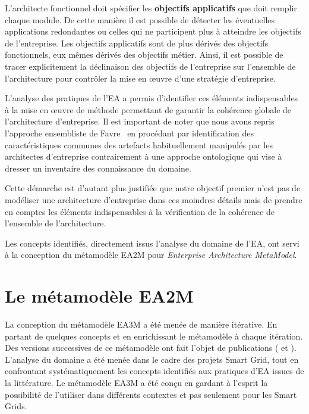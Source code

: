     L'architecte fonctionnel doit spécifier les \textbf{objectifs applicatifs} que doit remplir chaque module. De
    cette manière il est possible de détecter les éventuelles applications redondantes ou celles qui
    ne participent plus à atteindre les objectifs de l'entreprise. Les objectifs applicatifs sont de plus dérivés
    des objectifs fonctionnels, eux mêmes dérivés des objectifs métier. Ainsi, il est possible de tracer
    explicitement la déclinaison des objectifs de l'entreprise sur l'ensemble de l'architecture pour contrôler
    la mise en œuvre d'une stratégie d'entreprise.

    L'analyse des pratiques de l'EA a permis d'identifier ces éléments indispensables à la mise en œuvre
    de méthode permettant de garantir la cohérence globale de l'architecture d'entreprise. Il est important
    de noter que nous avons repris l'approche ensembliste de Favre~\cite{favre2005foundations} en procédant
    par identification des caractéristiques communes des artefacts habituellement manipulés par
    les architectes d'entreprise contrairement à une approche ontologique qui vise à dresser un inventaire des
    connaissance du domaine.

    Cette démarche est d'autant plus justifiée que notre objectif premier n'est pas de modéliser une architecture
    d'entreprise dans ces moindres détails mais de prendre en comptes les éléments indispensables à
    la vérification de la cohérence de l'ensemble de l'architecture.

    Les concepts identifiés, directement issus l'analyse du domaine de l'EA, ont servi à la conception du
    métamodèle EA2M pour \emph{Enterprise Architecture MetaModel}.

\section{Le métamodèle EA2M}
    La conception du métamodèle EA3M a été menée de manière itérative. En partant de quelques concepts
    et en enrichissant le métamodèle à chaque itération. Des versions successives de ce métamodèle
    ont fait l'objet de publications (\cite{seghiri2015simulation} et \cite{seghiri2016executable}).
    L'analyse du domaine a été menée dans le cadre des projets Smart Grid, tout en confrontant systématiquement
    les concepts identifiés aux pratiques d'EA issues de la littérature. Le métamodèle EA3M a été conçu en gardant
    à l'esprit la possibilité de l'utiliser dans différents contextes et pas seulement pour les Smart Grids.

